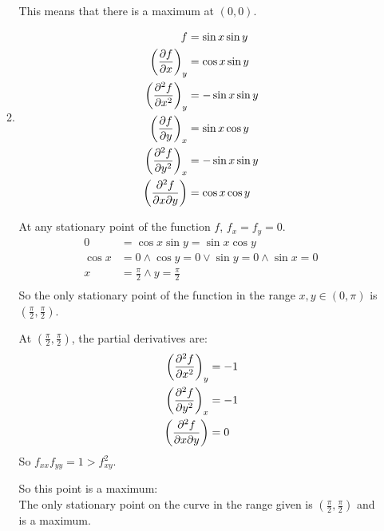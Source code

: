 \documentclass[10pt,\jkfside,a4paper]{article}
\begin{document}
\begin{enumerate}
\begin{enumerate}
This means that there is a maximum at $(0, 0)$.

\item 
\begin{equation}
\begin{split}
f &= \sin x \sin y \\
\left(\pdv{f}{x}\right)_y &= \cos x \sin y \\
\left(\pdv[2]{f}{x}\right)_y &= - \sin x \sin y \\
\left(\pdv{f}{y}\right)_x &= \sin x \cos y \\
\left(\pdv[2]{f}{y}\right)_x &= - \sin x \sin y \\
\left(\pdv[2]{f}{x}{y}\right) &= \cos x \cos y \\
\end{split}
\end{equation}

At any stationary point of the function $f$, $f_x = f_y = 0$.
\begin{equation}
\begin{split}
0 &= \cos x \sin y = \sin x \cos y \\
\cos x &= 0 \wedge \cos y = 0 \vee \sin y = 0 \wedge \sin x = 0 \\
x &= \frac{\pi}{2} \wedge y = \frac{\pi}{2} \\
\end{split}
\end{equation}
So the only stationary point of the function in the range $x, y \in (0, \pi)$ is 
$\left(\frac{\pi}{2}, \frac{\pi}{2}\right)$.

At $(\frac{\pi}{2}, \frac{\pi}{2})$, the partial derivatives are:
\begin{equation}
\begin{split}
\left(\pdv[2]{f}{x}\right)_y &= -1 \\
\left(\pdv[2]{f}{y}\right)_x &= -1 \\
\left(\pdv[2]{f}{x}{y}\right) &= 0 \\
\end{split}
\end{equation}
So $f_{xx}f_{yy} = 1 > f^2_{xy}$.

So this point is a maximum:\\
The only stationary point on the curve in the range given is $\left(\frac{\pi}{2}, \frac{\pi}{2}\right)$ 
and is a maximum.


\end{enumerate}
\end{enumerate}
\end{document}
